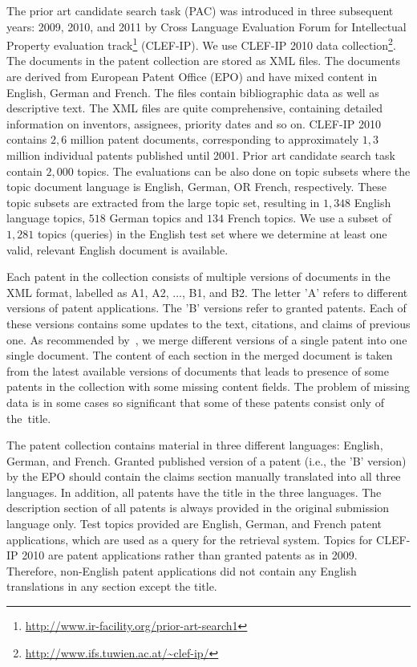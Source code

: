The prior art candidate search task (PAC) was introduced in three subsequent years: 
2009, 2010, and 2011 by Cross Language Evaluation Forum for Intellectual Property evaluation track\footnote{\url{http://www.ir-facility.org/prior-art-search1}} (CLEF-IP). 
We use CLEF-IP 2010 data collection\footnote{\url{http://www.ifs.tuwien.ac.at/~clef-ip/}}. 
The documents in the patent collection are stored as XML files. The documents are derived from 
European Patent Office (EPO) and have mixed content in English, German and French.
The files contain bibliographic data as well as descriptive text. The XML files are quite comprehensive, 
containing detailed information on inventors, assignees, priority dates and so on.
CLEF-IP 2010 contains $  2,6  $ million patent documents, corresponding to approximately $ 1,3 $ 
million individual patents published until 2001. Prior art candidate search task contain $2,000$ topics.
The evaluations can be also done on topic subsets where the topic document language is English, German, OR French, 
respectively. These topic subsets are extracted from the large topic set, resulting in $1,348$ English language topics, 
$518$ German topics and $134$ French topics. We use a subset of $1,281$ topics (queries)
in the English test set where we determine at least one
valid, relevant English document is available.

Each patent in the collection consists of multiple versions of documents in the XML format, labelled as A1, A2, $\ldots$, B1, and B2. The letter 'A' refers to different versions of patent applications. The 'B' versions refer to granted patents. Each of these versions contains some updates to the text, citations, and claims of previous one. As recommended by~\cite{magdy2012toward}, we merge different versions of a single patent into one single document. The content of each section in the merged document is taken from the latest available versions of documents that leads to presence of some patents in the collection with some missing content fields. The problem of missing data is in some cases so significant that some of these patents consist only of the~title.

The patent collection contains material in three different languages: English, German, and French. Granted published version of a patent (i.e., the 'B' version) by the EPO should contain the claims section manually translated into all three languages. In addition, all patents have the title in the three languages. The description section of all patents is always provided in the original submission language only.
Test topics provided are English, German, and French patent applications, which are used as a query for the retrieval system. Topics for CLEF-IP 2010 are patent applications rather than granted patents as in 2009. Therefore, non-English patent applications did not contain any English translations in any section except the title.%

